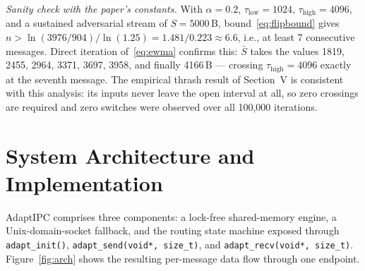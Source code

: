\documentclass[conference]{IEEEtran}
\newcommand{\taulow}{\tau_{\mathrm{low}}}
\newcommand{\tauhigh}{\tau_{\mathrm{high}}}
\newcommand{\sbar}{\bar{S}}
\begin{document}
\emph{Sanity check with the paper's constants.} With $\alpha = 0.2$,
$\taulow = 1024$, $\tauhigh = 4096$, and a sustained adversarial stream of
$S = 5000$\,B, bound~\eqref{eq:flipbound} gives
$n > \ln(3976/904)/\ln(1.25) = 1.481/0.223 \approx 6.6$, i.e., at least
7 consecutive messages. Direct iteration of~\eqref{eq:ewma} confirms this:
$\sbar$ takes the values 1819, 2455, 2964, 3371, 3697, 3958, and finally
4166\,B --- crossing $\tauhigh = 4096$ exactly at the seventh message. The
empirical thrash result of Section~V is consistent with this analysis: its
inputs never leave the open interval at all, so zero crossings are required
and zero switches were observed over all 100{,}000 iterations.


\section{System Architecture and Implementation}
AdaptIPC comprises three components: a lock-free shared-memory engine, a
Unix-domain-socket fallback, and the routing state machine exposed through
\texttt{adapt\_init()}, \texttt{adapt\_send(void*, size\_t)}, and
\texttt{adapt\_recv(void*, size\_t)}. Figure~\ref{fig:arch} shows the
resulting per-message data flow through one endpoint.
\end{document}
